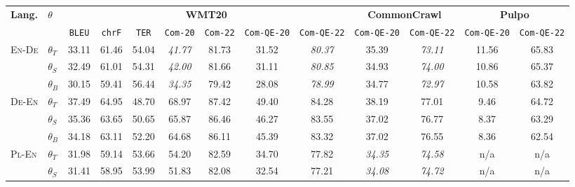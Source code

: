 \vspace{.3cm}
\noindent\begin{minipage}{\textwidth}
    \begin{center}
    {\centering\small\setlength{\tabcolsep}{2.3pt}
    \begin{tabular}{llccccccccccc}
    \toprule
    \textbf{Lang.} & \textbf{$\theta$} & \multicolumn{7}{c}{\textbf{WMT20}} & \multicolumn{2}{c}{\textbf{CommonCrawl}} & \multicolumn{2}{c}{\textbf{Pulpo}} \\
                     &   & \texttt{BLEU} & \texttt{chrF} & \texttt{TER} & \texttt{Com-20} & \texttt{Com-22} & \texttt{Com-QE-20} & \texttt{Com-QE-22} & \texttt{Com-QE-20} & \texttt{Com-QE-22} & \texttt{Com-QE-20} & \texttt{Com-QE-22} \\\midrule\midrule 
    \multirow{3}{*}{\textsc{En}-\textsc{De}}  & $\theta_T$   & 33.11 & 61.46 & 54.04 & \textit{41.77} & 81.73 & 31.52 & \textit{80.37} & 35.39          & \textit{73.11} & 11.56 & 65.83 \\
                                              & $\theta_{S}$ & 32.49 & 61.01 & 54.31 & \textit{42.00} & 81.66 & 31.11 & \textit{80.85} & 34.93          & \textit{74.00} & 10.86 & 65.37 \\
                                              & $\theta_{B}$ & 30.15 & 59.41 & 56.44 & \textit{34.35} & 79.42 & 28.08 & \textit{78.99} & 34.77          & \textit{72.97} & 10.58 & 63.82 \\\midrule
    \multirow{3}{*}{\textsc{De}-\textsc{En}}  & $\theta_T$   & 37.49 & 64.95 & 48.70 & 68.97          & 87.42 & 49.40 & 84.28          & 38.19          & 77.01          & 9.46  & 64.72 \\
                                              & $\theta_{S}$ & 35.36 & 63.65 & 50.65 & 65.87          & 86.46 & 46.27 & 83.55          & 37.02          & 76.77          & 8.37  & 63.29 \\
                                              & $\theta_{B}$ & 34.18 & 63.11 & 52.20 & 64.68          & 86.11 & 45.39 & 83.32          & 37.02          & 76.55          & 8.36  & 62.54 \\ \midrule
    \multirow{3}{*}{\textsc{Pl}-\textsc{En}}  & $\theta_T$   & 31.98 & 59.14 & 53.66 & 54.20          & 82.59 & 34.70 & 77.82          & \textit{34.35} & \textit{74.58} & n/a   & n/a \\
                                              & $\theta_{S}$ & 31.41 & 58.95 & 53.99 & 51.83          & 82.08 & 32.54 & 77.21          & \textit{34.08} & \textit{74.72} & n/a   & n/a \\

\end{tabular}}
\end{center}
\end{minipage}
